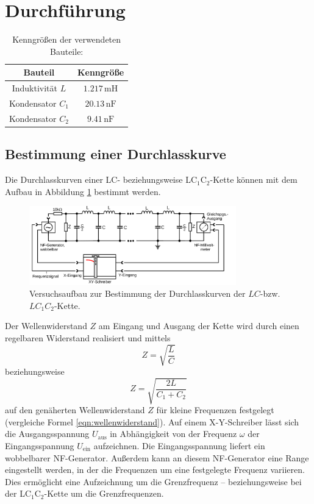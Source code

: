 \section{Durchführung}
\label{sec:Durchführung}

\begin{table}
	\caption{Kenngrößen der verwendeten Bauteile: }
	\label{tab:bauteile}
	\centering
	\begin{tabular}{cc}
		\toprule
		Bauteil& Kenngröße\\
		\midrule
	Induktivität $L $           & $1.217 \,\si{\milli\henry}$\\
		Kondensator $C_1$                & $20.13 \,\si{\nano\farad}$              \\
    Kondensator $C_2$                & $9.41\,\si{\nano\farad}$              \\
    	\bottomrule
	\end{tabular}
\end{table}
\subsection{Bestimmung einer Durchlasskurve}
Die Durchlasskurven einer LC- beziehungsweise LC$_1$C$_2$-Kette können
mit dem Aufbau in Abbildung \ref{fig:durchlasskurve} bestimmt werden.
\begin{figure}
    \centering
    \includegraphics[width=0.8\textwidth]{Bilder/durchlasskurve.png}
    \caption{Versuchsaufbau zur Bestimmung der Durchlasskurven der $LC$-bzw. $LC_1C_2$-Kette. \cite{Anleitung}}
    \label{fig:durchlasskurve}
\end{figure}
Der Wellenwiderstand $Z$ am Eingang und Ausgang der Kette wird durch einen
regelbaren Widerstand realisiert und mittels
\begin{equation}
	Z = \sqrt{\frac{L}{C}}
\end{equation}
beziehungsweise
\begin{equation}
	Z = \sqrt{\frac{2L}{C_1+C_2}}
\end{equation}
auf den genäherten Wellenwiderstand $Z$ für kleine Frequenzen festgelegt (vergleiche Formel \eqref{eqn:wellenwiderstand}).
Auf einem X-Y-Schreiber lässt sich die Ausgangsspannung $U_{\text{aus}}$ in Abhängigkeit von der Frequenz $\omega$ der Eingangsspannung $U_{\text{ein}}$ aufzeichnen.
Die Eingangsspannung liefert ein wobbelbarer NF-Generator.
Außerdem kann an diesem NF-Generator eine Range eingestellt werden, in der die Frequenzen um eine festgelegte Frequenz variieren.
Dies ermöglicht eine Aufzeichnung um die Grenzfrequenz -- beziehungsweise
bei der LC$_1$C$_2$-Kette um die Grenzfrequenzen.

